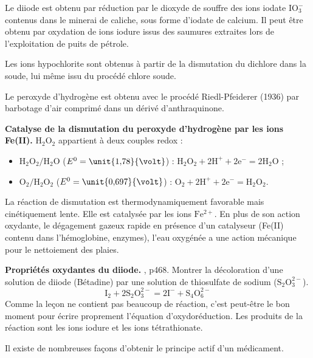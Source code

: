 \begin{remarque}
Le diiode est obtenu par réduction par le dioxyde de souffre des ions iodate $\mathrm{IO_3^-}$ contenus dans le minerai de caliche, sous forme d'iodate de calcium.
Il peut être obtenu par oxydation de ions iodure issus des saumures extraites lors de l'exploitation de puits de pétrole.

\noindent
Les ions hypochlorite sont obtenus à partir de la dismutation du dichlore dans la soude, lui même issu du procédé chlore soude.

\noindent
Le peroxyde d'hydrogène est obtenu avec le procédé Riedl-Pfeiderer (1936) par barbotage d'air comprimé dans un dérivé d'anthraquinone.
\end{remarque}

\begin{experience}
\textbf{Catalyse de la dismutation du peroxyde d'hydrogène par les ions Fe(II).}
$\mathrm{H_2O_2}$ appartient à deux couples redox :
\begin{itemize}
\item $\mathrm{H_2O_2/H_2O}$ ($E^0 = \unit{1{,}78}{\volt}$) : $\mathrm{H_2O_2 + 2H^+ + 2e^- = 2H_2O}$ ;
\item $\mathrm{O_2/H_2O_2}$ ($E^0 = \unit{0{,}697}{\volt}$) : $\mathrm{O_2 + 2H^+ + 2e^- = H_2O_2}$.
\end{itemize}
La réaction de dismutation est thermodynamiquement favorable mais cinétiquement lente.
Elle est catalysée par les ions $\mathrm{Fe^{2+}}$.
En plus de son action oxydante, le dégagement gazeux rapide en présence d'un catalyseur (Fe(II) contenu dans l'hémoglobine, enzymes), l'eau oxygénée a une action mécanique pour le nettoiement des plaies.
\end{experience}

\begin{experience}
\textbf{Propriétés oxydantes du diiode.}
\cite{Dulaurans2012}, p468.
Montrer la décoloration d'une solution de diiode (Bétadine) par une solution de thiosulfate de sodium ($\mathrm{S_2O_3^{2-}}$).
\begin{equation}
\mathrm{I_2 + 2S_2O_3^{2-} = 2I^- + S_4O_6^{2-}}
\end{equation}
Comme la leçon ne contient pas beaucoup de réaction, c'est peut-être le bon moment pour écrire proprement l'équation d'oxydoréduction.
Les produits de la réaction sont les ions iodure et les ions tétrathionate. 
\end{experience}

\begin{transition}
Il existe de nombreuses façons d'obtenir le principe actif d'un médicament.
\end{transition}

